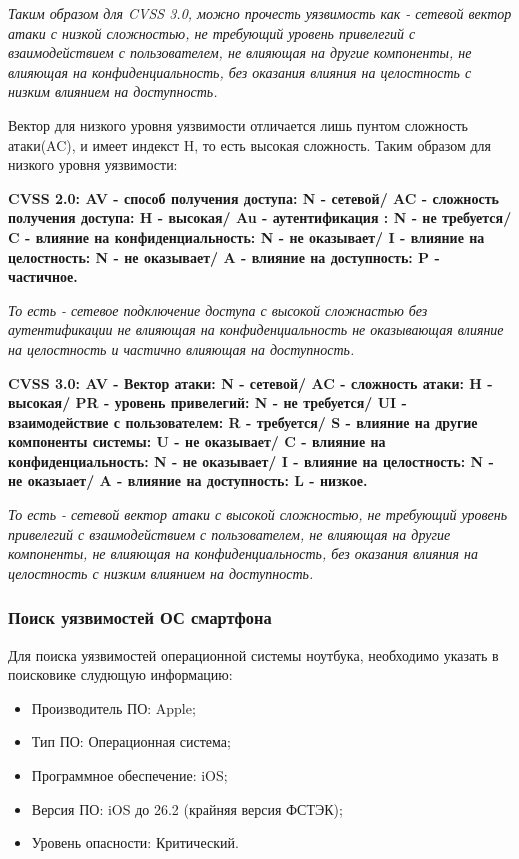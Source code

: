 \documentclass[areasetadvanced]{scrartcl}
\begin{document}
\emph{Таким образом для CVSS 3.0, можно прочесть уязвимость как - сетевой вектор атаки с низкой сложностью, не требующий уровень привелегий с взаимодействием с пользователем, не влияющая на другие компоненты, не влияющая на конфиденциальность, без оказания влияния на целостность с низким влиянием на доступность.}

Вектор для низкого уровня уязвимости отличается лишь пунтом \guillemetleft сложность атаки\guillemetright (AC), и имеет индекст H, то есть высокая сложность. Таким образом для низкого уровня уязвимости:

\textbf{CVSS 2.0: AV - способ получения доступа: N - сетевой/ AC - сложность получения доступа: H - высокая/ Au - аутентификация : N - не требуется/
C - влияние на конфиденциальность: N - не оказывает/ I - влияние на целостность: N - не оказывает/ A - влияние на доступность: P - частичное.}

\emph{То есть - сетевое подключение доступа с высокой сложнастью без аутентификации не влияющая на конфиденциальность не оказывающая влияние на целостность и частично влияющая на доступность.}

\textbf{CVSS 3.0: AV - Вектор атаки: N - сетевой/ AC - сложность атаки: H - высокая/ PR - уровень привелегий: N - не требуется/ UI - взаимодействие с пользователем: R - требуется/ S - влияние на другие компоненты системы: U - не оказывает/ C - влияние на конфиденциальность: N - не оказывает/ I - влияние на целостность: N - не оказыает/ A - влияние на доступность: L - низкое.}

\emph{То есть - сетевой вектор атаки с высокой сложностью, не требующий уровень привелегий с взаимодействием с пользователем, не влияющая на другие компоненты, не влияющая на конфиденциальность, без оказания влияния на целостность с низким влиянием на доступность.}

\subsubsection{Поиск уязвимостей ОС смартфона}
Для поиска уязвимостей операционной системы ноутбука, необходимо указать в поисковике слудющую информацию:

\begin{itemize}
    \item Производитель ПО: Apple;
    \item Тип ПО: Операционная система;
    \item Программное обеспечение: iOS;
    \item Версия ПО: iOS до 26.2 (крайняя версия ФСТЭК);
    \item Уровень опасности: Критический.
\end{itemize}
\end{document}

